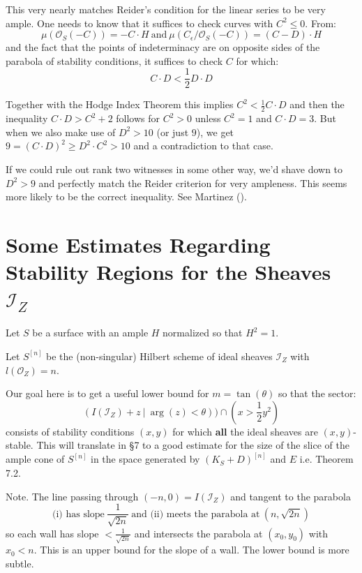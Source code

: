 \documentclass{amsart}
\begin{document}
\medskip

This very nearly matches Reider's condition for the linear series to be very ample. One needs to know that it suffices to check curves with $C^2 \le 0$. From:
\[ \mu({\mathcal O}_S(-C)) = -C \cdot H   \ \mbox{and} \ \mu(C_\epsilon/{\mathcal O}_S(-C)) = (C - D)\cdot H \] 
and the fact that the points of indeterminacy are on opposite sides of the parabola of stability conditions,  it suffices to check $C$ for which: 
\[ C\cdot D < \frac 12 D \cdot D \] 

Together with the Hodge Index Theorem this implies 
$C^2 < \frac 12 C \cdot D$
and then the inequality $C\cdot D > C^2 + 2$ follows for $C^2 > 0$ unless $C^2 = 1$ and $C \cdot D = 3$. But when we also make 
use of $D^2 > 10$ (or just $9$), we get 
$9 = (C \cdot D)^2 \ge D^2 \cdot C^2  > 10$ and a contradiction to that case.   

\medskip

 If we could rule out rank two witnesses in some other way, we'd shave down to $D^2 > 9$ and perfectly
match the Reider criterion for very ampleness. This seems more likely to be the correct inequality. See Martinez (\cite{Ma}).  


\section{Some Estimates Regarding Stability Regions for the Sheaves ${\mathcal I}_Z$} 

Let $S$ be a surface with an ample $H$  normalized so that $H^2 = 1$. 

\medskip

Let $S^{[n]}$ be the (non-singular) Hilbert scheme of ideal sheaves ${\mathcal I}_Z$ with $l({\mathcal O}_Z) = n$. 

\medskip

Our goal here is to get a useful lower bound for $m = \tan(\theta)$ so that the sector: 
\[ \left( I({\mathcal I}_Z) + z \ | \ \arg(z) < \theta\right))  \cap (x > \frac 12 y^2) \] 
consists of stability conditions $(x,y)$ for which {\bf all} the ideal sheaves are $(x,y)$-stable. 
This will translate in \S 7 to a good estimate for the size of the slice of the ample cone of $S^{[n]}$ in the space generated by 
 $(K_S + D)^{[n]}$ and $E$ i.e. Theorem 7.2.

\medskip

\nt Note. The line passing through $(-n,0) = I({\mathcal I}_Z)$ and tangent to the parabola
\[ \ \mbox{(i) \ has slope} \ \frac 1{\sqrt {2n}} \ \mbox{and (ii) \ meets the parabola at} \ \left( n, \sqrt{2n} \right)  \  \] 
so each wall has slope $< \frac 1{\sqrt{2n}}$ and intersects the parabola at $(x_0,y_0)$ with $x_0 < n$. 
This is an upper bound for the slope of a wall. The lower bound is more subtle. 
\end{document}

